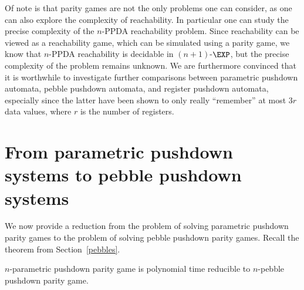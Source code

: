 \documentclass[a4paper,UKenglish,cleveref, autoref, thm-restate]{lipics-v2021}
\begin{document}
Of note is that parity games are 
not the only problems one can consider, as one can
also explore the complexity of reachability. 
In particular
one can 
study the precise complexity of the
{\sc $n$-PPDA reachability} problem.
Since reachability can be viewed as a reachability game, which can be simulated using a parity game, we know that
{\sc $n$-PPDA reachability} is decidable in $(n+1)$-$\EXP$, 
but the precise complexity of the problem remains unknown.
We are furthermore convinced that it is worthwhile to investigate further comparisons between parametric pushdown automata, pebble pushdown automata, 
and register pushdown automata, especially since the latter have been shown to only really ``remember'' at most  $3r$ data values, where $r$ is the number of registers. 









\appendix


\setcounter{theorem}{0}

\section{From parametric pushdown 
systems 
to pebble pushdown systems
}\label{appendix A}

We now provide a reduction from the problem of solving parametric pushdown parity games to the problem of solving pebble pushdown parity games. Recall the theorem from Section~\ref{pebbles}.


\begin{theorem}\label{PPDA reduction}
{\sc $n$-parametric pushdown parity game} 
is polynomial time reducible to
{\sc $n$-pebble pushdown parity game}.
\end{theorem}
\end{document}
